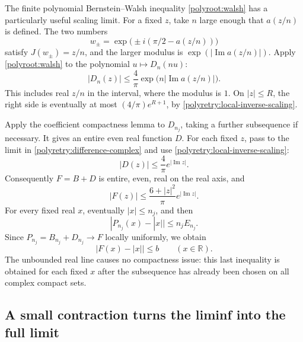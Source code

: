 \documentclass[11pt]{article}
\newcommand{\R}{\mathbb R}
\theoremstyle{remark}
\numberwithin{equation}{section}
\begin{document}
The finite polynomial Bernstein--Walsh inequality
\eqref{polyroot:walsh} has a particularly useful scaling limit.
For a fixed $z$, take $n$ large enough that $a(z/n)$ is defined.
The two numbers
\[
 w_\pm=\exp\bigl(\pm i(\pi/2-a(z/n))\bigr)
\]
satisfy $J(w_\pm)=z/n$, and the larger modulus is
$\exp(|\operatorname{Im}a(z/n)|)$.  Apply
\eqref{polyroot:walsh} to the polynomial $u\mapsto D_n(nu)$:
\begin{equation}\label{polyretry:difference-complex}
 |D_n(z)|\le\frac4\pi
 \exp\bigl(n|\operatorname{Im}a(z/n)|\bigr).
\end{equation}
This includes real $z/n$ in the interval, where the modulus is $1$.
On $|z|\le R$, the right side is eventually at most
$(4/\pi)e^{R+1}$, by \eqref{polyretry:local-inverse-scaling}.

Apply the coefficient compactness lemma to $D_{n_j}$, taking a further
subsequence if necessary.  It gives an entire even real function $D$.
For each fixed $z$, pass to the limit in
\eqref{polyretry:difference-complex} and use
\eqref{polyretry:local-inverse-scaling}:
\[
 |D(z)|\le\frac4\pi e^{|\operatorname{Im}z|}.
\]
Consequently $F=B+D$ is entire, even, real on the real axis, and
\begin{equation}\label{polyretry:extremal-growth}
 |F(z)|\le\frac{6+|z|^2}{\pi}e^{|\operatorname{Im}z|}.
\end{equation}
For every fixed real $x$, eventually $|x|\le n_j$, and then
\[
 |P_{n_j}(x)-|x||\le n_jE_{n_j}.
\]
Since $P_{n_j}=B_{n_j}+D_{n_j}\to F$ locally uniformly, we obtain
\begin{equation}\label{polyretry:global-real-error}
 |F(x)-|x||\le b\qquad(x\in\R).
\end{equation}
The unbounded real line causes no compactness issue: this last
inequality is obtained for each fixed $x$ after the subsequence has
already been chosen on all complex compact sets.

\subsection{A small contraction turns the liminf into the full limit}
\label{polyretry:contraction}
\end{document}
